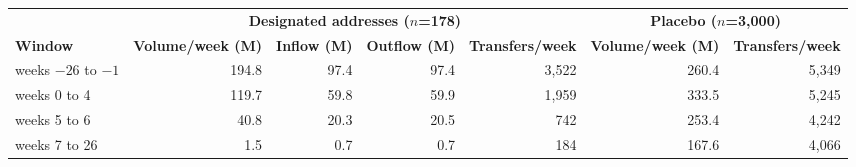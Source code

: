 \begin{tabular}{lrrrrrr}
\toprule
 & \multicolumn{4}{c}{\textbf{Designated addresses ($n$=178)}} & \multicolumn{2}{c}{\textbf{Placebo ($n$=3,000)}} \\
\cmidrule(lr){2-5}\cmidrule(lr){6-7}
\textbf{Window} & \textbf{Volume/week (M)} & \textbf{Inflow (M)} & \textbf{Outflow (M)} & \textbf{Transfers/week} & \textbf{Volume/week (M)} & \textbf{Transfers/week} \\
\midrule
weeks $-26$ to $-1$ & 194.8 & 97.4 & 97.4 & 3,522 & 260.4 & 5,349 \\
weeks 0 to 4 & 119.7 & 59.8 & 59.9 & 1,959 & 333.5 & 5,245 \\
weeks 5 to 6 & 40.8 & 20.3 & 20.5 & 742 & 253.4 & 4,242 \\
weeks 7 to 26 & 1.5 & 0.7 & 0.7 & 184 & 167.6 & 4,066 \\
\bottomrule
\end{tabular}
